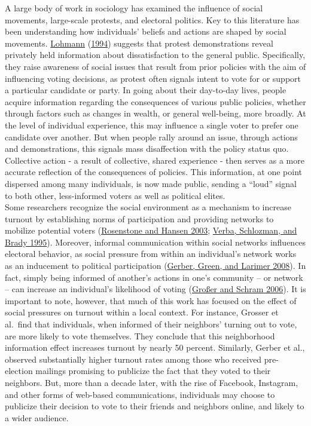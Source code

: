 \documentclass[
  12pt,
]{article}
\begin{document}
A large body of work in sociology has examined the influence of social movements, large-scale protests, and electoral politics. Key to this literature has been understanding how individuals' beliefs and actions are shaped by social movements. \protect\hyperlink{ref-Lohmann1994}{Lohmann} (\protect\hyperlink{ref-Lohmann1994}{1994}) suggests that protest demonstrations reveal privately held information about dissatisfaction to the general public. Specifically, they raise awareness of social issues that result from prior policies with the aim of influencing voting decisions, as protest often signals intent to vote for or support a particular candidate or party. In going about their day-to-day lives, people acquire information regarding the consequences of various public policies, whether through factors such as changes in wealth, or general well-being, more broadly. At the level of individual experience, this may influence a single voter to prefer one candidate over another. But when people rally around an issue, through actions and demonstrations, this signals mass disaffection with the policy status quo. Collective action - a result of collective, shared experience - then serves as a more accurate reflection of the consequences of policies. This information, at one point dispersed among many individuals, is now made public, sending a ``loud'' signal to both other, less-informed voters as well as political elites.\\
Some researchers recognize the social environment as a mechanism to increase turnout by establishing norms of participation and providing networks to mobilize potential voters (\protect\hyperlink{ref-Rosenstone2003}{Rosenstone and Hansen 2003}; \protect\hyperlink{ref-Verba1995}{Verba, Schlozman, and Brady 1995}). Moreover, informal communication within social networks influences electoral behavior, as social pressure from within an individual's network works as an inducement to political participation (\protect\hyperlink{ref-Gerber2008}{Gerber, Green, and Larimer 2008}). In fact, simply being informed of another's actions in one's community -- or network -- can increase an individual's likelihood of voting (\protect\hyperlink{ref-Grosser2006}{Großer and Schram 2006}).
It is important to note, however, that much of this work has focused on the effect of social pressures on turnout within a local context. For instance, Grosser et al.~find that individuals, when informed of their neighbors' turning out to vote, are more likely to vote themselves. They conclude that this neighborhood information effect increases turnout by nearly 50 percent. Similarly, Gerber et al., observed substantially higher turnout rates among those who received pre-election mailings promising to publicize the fact that they voted to their neighbors. But, more than a decade later, with the rise of Facebook, Instagram, and other forms of web-based communications, individuals may choose to publicize their decision to vote to their friends and neighbors online, and likely to a wider audience.
\end{document}
